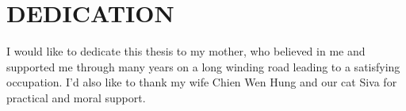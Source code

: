 \chapter*{DEDICATION}

I would like to dedicate this thesis to my mother, who believed in me and supported me through many years on a long winding road leading to a satisfying occupation.  I'd also like to thank my wife Chien Wen Hung and our cat Siva for practical and moral support.
